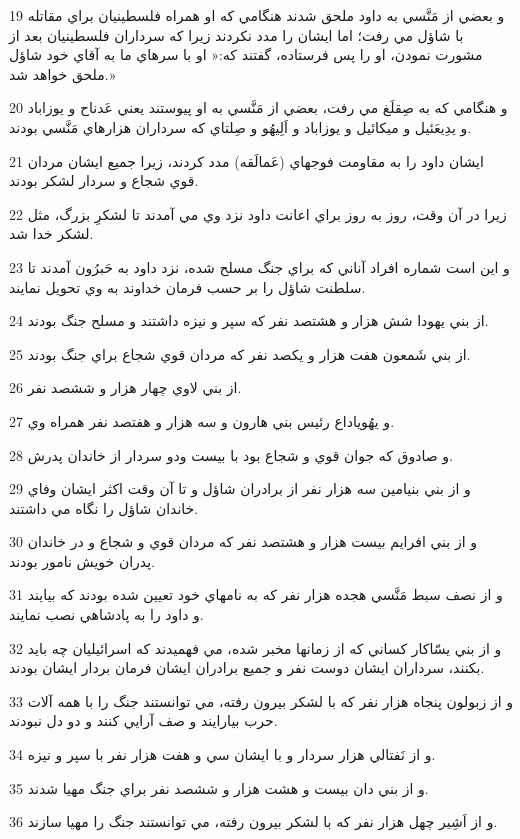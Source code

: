 \par 19 و بعضي از مَنَّسي به داود ملحق شدند هنگامي که او همراه فلسطينيان براي مقاتله با شاؤل مي رفت؛ اما ايشان را مدد نکردند زيرا که سرداران فلسطينيان بعد از مشورت نمودن، او را پس فرستاده، گفتند که:« او با سرهاي ما به آقاي خود شاؤل ملحق خواهد شد.»
\par 20 و هنگامي که به صِقلَغ مي رفت، بعضي از مَنَّسي به او پيوستند يعني عَدناح و يوزاباد و يدِيعَئيل و ميکائيل و يوزاباد و اَلِيهُو و صِلتاي که سرداران هزارهاي مَنَّسي بودند.
\par 21 ايشان داود را به مقاومت فوجهاي (عَمالَقه) مدد کردند، زيرا جميع ايشان مردان قوي شجاع و سردار لشکر بودند.
\par 22 زيرا در آن وقت، روز به روز براي اعانت داود نزد وي مي آمدند تا لشکرِ بزرگ، مثل لشکر خدا شد.
\par 23 و اين است شماره افراد آناني که براي جنگ مسلح شده، نزد داود به حَبرُون آمدند تا سلطنت شاؤل را بر حسب فرمان خداوند به وي تحويل نمايند.
\par 24 از بني يهودا شش هزار و هشتصد نفر که سپر و نيزه داشتند و مسلح جنگ بودند.
\par 25 از بني شَمعون هفت هزار و يکصد نفر که مردان قوي شجاع براي جنگ بودند.
\par 26 از بني لاوي چهار هزار و ششصد نفر.
\par 27 و يهُوياداع رئيس بني هارون و سه هزار و هفتصد نفر همراه وي.
\par 28 و صادوق که جوان قوي و شجاع بود با بيست ودو سردار از خاندان پدرش.
\par 29 و از بني بنيامين سه هزار نفر از برادران شاؤل و تا آن وقت اکثر ايشان وفاي خاندان شاؤل را نگاه مي داشتند.
\par 30 و از بني افرايم بيست هزار و هشتصد نفر که مردان قوي و شجاع و در خاندان پدران خويش نامور بودند.
\par 31 و از نصف سبط مَنَّسي هجده هزار نفر که به نامهاي خود تعيين شده بودند که بيايند و داود را به پادشاهي نصب نمايند.
\par 32 و از بني يسّاکار کساني که از زمانها مخبر شده، مي فهميدند که اسرائيليان چه بايد بکنند، سرداران ايشان دوست نفر و جميع برادران ايشان فرمان بردار ايشان بودند.
\par 33 و از زبولون پنجاه هزار نفر که با لشکر بيرون رفته، مي توانستند جنگ را با همه آلات حرب بيارايند و صف آرايي کنند و دو دل نبودند.
\par 34 و از نَفتالي هزار سردار و با ايشان سي و هفت هزار نفر با سپر و نيزه.
\par 35 و از بني دان بيست و هشت هزار و ششصد نفر براي جنگ مهيا شدند.
\par 36 و از اَشِير چهل هزار نفر که با لشکر بيرون رفته، مي توانستند جنگ را مهيا سازند.
